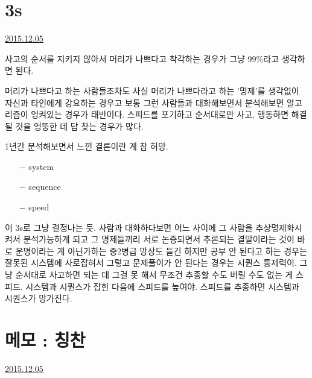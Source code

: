 \section{3s}
\href{https://www.kockoc.com/Apoc/528601}{2015.12.05}

\vspace{5mm}

사고의 순서를 지키지 않아서 머리가 나쁘다고 착각하는 경우가 그냥 99$\%$라고 생각하면 된다.
\vspace{5mm}

머리가 나쁘다고 하는 사람들조차도 사실 머리가 나쁘다라고 하는 '명제'를 생각없이 자신과 타인에게 강요하는 경우고
보통 그런 사람들과 대화해보면서 분석해보면 알고리즘이 엉켜있는 경우가 태반이다.
스피드를 포기하고 순서대로만 사고, 행동하면 해결될 것을 엉뚱한 데 답 찾는 경우가 많다.
\vspace{5mm}

1년간 분석해보면서 느낀 결론이란 게 참 허망.
\vspace{5mm}

\begin{itemize}
    \item[$-$] system
    \item[$-$] sequence
    \item[$-$] speed
\end{itemize}

\vspace{5mm}

이 3s로 그냥 결정나는 듯.
사람과 대화하다보면 어느 사이에 그 사람을 추상명제화시켜서 분석가능하게 되고
그 명제들끼리 서로 논증되면서 추론되는 결말이라는 것이 바로 운명이라는 게 아닌가하는 중2병급 망상도 들긴 하지만
공부 안 된다고 하는 경우는 잘못된 시스템에 사로잡혀서 그렇고
문제풀이가 안 된다는 경우는 시퀀스 통제력이. 그냥 순서대로 사고하면 되는 데 그걸 못 해서
무조건 추종할 수도 버릴 수도 없는 게 스피드. 시스템과 시퀀스가 잡힌 다음에 스피드를 높여야.
스피드를 추종하면 시스템과 시퀀스가 망가진다.
\vspace{5mm}









\section{메모 : 칭찬}
\href{https://www.kockoc.com/Apoc/528801}{2015.12.05}

